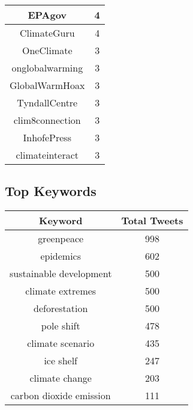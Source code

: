 \documentclass{article}\usepackage[T1]{fontenc}
\begin{document}
\begin{tabular}{|c|c|}
EPAgov & 4\\ 
 \hline
ClimateGuru & 4\\ 
 \hline
OneClimate & 3\\ 
 \hline
onglobalwarming & 3\\ 
 \hline
GlobalWarmHoax & 3\\ 
 \hline
TyndallCentre & 3\\ 
 \hline
clim8connection & 3\\ 
 \hline
InhofePress & 3\\ 
 \hline
climateinteract & 3\\ 
 \hline
\end{tabular}\subsection*{Top Keywords}\begin{tabular}{|c|c|}         \hline         Keyword & Total Tweets \\ 
 \hline
greenpeace & 998\\ 
 \hline
epidemics & 602\\ 
 \hline
sustainable development & 500\\ 
 \hline
climate extremes & 500\\ 
 \hline
deforestation & 500\\ 
 \hline
pole shift & 478\\ 
 \hline
climate scenario & 435\\ 
 \hline
ice shelf & 247\\ 
 \hline
climate change & 203\\ 
 \hline
carbon dioxide emission & 111\\ 
 \hline
\end{tabular}
\end{document}
